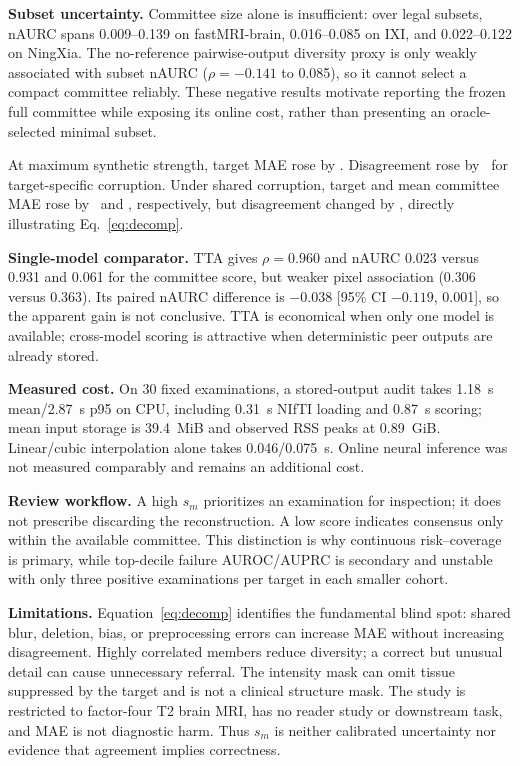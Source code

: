 \documentclass{article}
\begin{document}
\textbf{Subset uncertainty.} Committee size alone is insufficient: over legal subsets, nAURC spans 0.009--0.139 on fastMRI-brain, 0.016--0.085 on IXI, and 0.022--0.122 on NingXia. The no-reference pairwise-output diversity proxy is only weakly associated with subset nAURC ($\rho=-0.141$ to 0.085), so it cannot select a compact committee reliably. These negative results motivate reporting the frozen full committee while exposing its online cost, rather than presenting an oracle-selected minimal subset.

At maximum synthetic strength, target MAE rose by \StressMaeIncrease. Disagreement rose by \StressTargetIncrease\ for target-specific corruption. Under shared corruption, target and mean committee MAE rose by \StressMaeIncrease\ and \StressCommitteeMaeIncrease, respectively, but disagreement changed by \StressSharedChange, directly illustrating Eq.~\eqref{eq:decomp}.

\textbf{Single-model comparator.} TTA gives $\rho=0.960$ and nAURC 0.023 versus 0.931 and 0.061 for the committee score, but weaker pixel association (0.306 versus 0.363). Its paired nAURC difference is $-0.038$ [95\% CI $-0.119$, 0.001], so the apparent gain is not conclusive. TTA is economical when only one model is available; cross-model scoring is attractive when deterministic peer outputs are already stored.

\textbf{Measured cost.} On 30 fixed examinations, a stored-output audit takes 1.18~s mean/2.87~s p95 on CPU, including 0.31~s NIfTI loading and 0.87~s scoring; mean input storage is 39.4~MiB and observed RSS peaks at 0.89~GiB. Linear/cubic interpolation alone takes 0.046/0.075~s. Online neural inference was not measured comparably and remains an additional cost.

\textbf{Review workflow.} A high $s_m$ prioritizes an examination for inspection; it does not prescribe discarding the reconstruction. A low score indicates consensus only within the available committee. This distinction is why continuous risk--coverage is primary, while top-decile failure AUROC/AUPRC is secondary and unstable with only three positive examinations per target in each smaller cohort.

\textbf{Limitations.} Equation~\eqref{eq:decomp} identifies the fundamental blind spot: shared blur, deletion, bias, or preprocessing errors can increase MAE without increasing disagreement. Highly correlated members reduce diversity; a correct but unusual detail can cause unnecessary referral. The intensity mask can omit tissue suppressed by the target and is not a clinical structure mask. The study is restricted to factor-four T2 brain MRI, has no reader study or downstream task, and MAE is not diagnostic harm. Thus $s_m$ is neither calibrated uncertainty nor evidence that agreement implies correctness.
\end{document}
